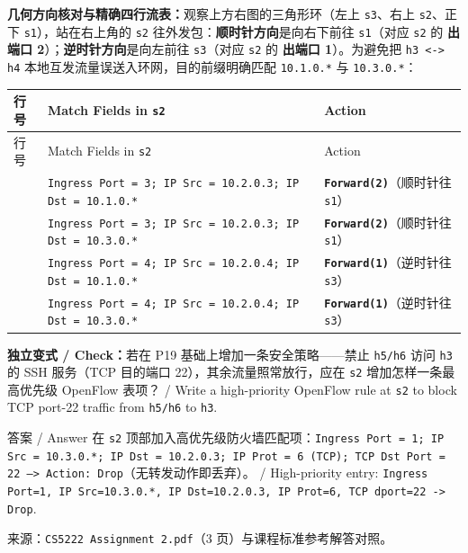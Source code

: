 \textbf{几何方向核对与精确四行流表：}观察上方右图的三角形环（左上 \texttt{s3}、右上 \texttt{s2}、正下 \texttt{s1}），站在右上角的 \texttt{s2} 往外发包：\textbf{顺时针方向}是向右下前往 \texttt{s1}（对应 \texttt{s2} 的 \textbf{出端口 2}）；\textbf{逆时针方向}是向左前往 \texttt{s3}（对应 \texttt{s2} 的 \textbf{出端口 1}）。为避免把 \texttt{h3 <-> h4} 本地互发流量误送入环网，目的前缀明确匹配 \texttt{10.1.0.*} 与 \texttt{10.3.0.*}：

\begingroup\small\setlength{\tabcolsep}{3pt}\renewcommand{\arraystretch}{1.20}
\begin{longtable}{@{}>{\raggedright\arraybackslash}p{}>{\raggedright\arraybackslash}p{}>{\raggedright\arraybackslash}p{}@{}}
\toprule
行号 & Match Fields in \texttt{s2} & Action \\
\midrule\endfirsthead
行号 & Match Fields in \texttt{s2} & Action \\
\midrule\endhead
\bottomrule\endfoot
1 & \texttt{Ingress Port = 3; IP Src = 10.2.0.3; IP Dst = 10.1.0.*} & \textbf{\texttt{Forward(2)}}（顺时针往 \texttt{s1}） \\
2 & \texttt{Ingress Port = 3; IP Src = 10.2.0.3; IP Dst = 10.3.0.*} & \textbf{\texttt{Forward(2)}}（顺时针往 \texttt{s1}） \\
3 & \texttt{Ingress Port = 4; IP Src = 10.2.0.4; IP Dst = 10.1.0.*} & \textbf{\texttt{Forward(1)}}（逆时针往 \texttt{s3}） \\
4 & \texttt{Ingress Port = 4; IP Src = 10.2.0.4; IP Dst = 10.3.0.*} & \textbf{\texttt{Forward(1)}}（逆时针往 \texttt{s3}） \\
\end{longtable}\endgroup

\textbf{独立变式 / Check：}若在 P19 基础上增加一条安全策略——禁止 \texttt{h5/h6} 访问 \texttt{h3} 的 SSH 服务（TCP 目的端口 22），其余流量照常放行，应在 \texttt{s2} 增加怎样一条最高优先级 OpenFlow 表项？ / Write a high-priority OpenFlow rule at \texttt{s2} to block TCP port-22 traffic from \texttt{h5/h6} to \texttt{h3}.

\begin{StudySolution}{答案 / Answer}
在 \texttt{s2} 顶部加入高优先级防火墙匹配项：\texttt{Ingress Port = 1; IP Src = 10.3.0.*; IP Dst = 10.2.0.3; IP Prot = 6 (TCP); TCP Dst Port = 22  -->  Action: Drop}（无转发动作即丢弃）。 / High-priority entry: \texttt{Ingress Port=1, IP Src=10.3.0.*, IP Dst=10.2.0.3, IP Prot=6, TCP dport=22 -> Drop}.
\end{StudySolution}

来源：\texttt{CS5222 Assignment 2.pdf}（3 页）与课程标准参考解答对照。
